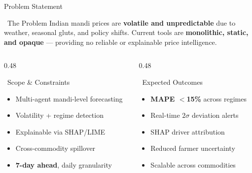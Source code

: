 \documentclass{beamer}
\begin{document}
\begin{frame}[label=problem]{Problem Statement}

\begin{alertcard}{~The Problem}
\scriptsize
Indian mandi prices are \textbf{volatile and unpredictable} due to weather, seasonal gluts, and policy shifts. Current tools are \textbf{monolithic, static, and opaque} --- providing no reliable or explainable price intelligence.
\end{alertcard}

\vspace{0.04cm}

\begin{columns}[T]
\begin{column}{0.48\textwidth}
\begin{purplecard}{~Scope \& Constraints}
\scriptsize
\begin{itemize}\setlength\itemsep{1pt}
\item Multi-agent mandi-level forecasting
\item Volatility + regime detection
\item Explainable via SHAP/LIME
\item Cross-commodity spillover
\item \textbf{7-day ahead}, daily granularity
\end{itemize}
\end{purplecard}
\end{column}
\begin{column}{0.48\textwidth}
\begin{successcard}{~Expected Outcomes}
\scriptsize
\begin{itemize}\setlength\itemsep{1pt}
\item \textbf{MAPE $<$15\%} across regimes
\item Real-time $2\sigma$ deviation alerts
\item SHAP driver attribution
\item Reduced farmer uncertainty
\item Scalable across commodities
\end{itemize}
\end{successcard}
\end{column}
\end{columns}

\end{frame}
\end{document}
